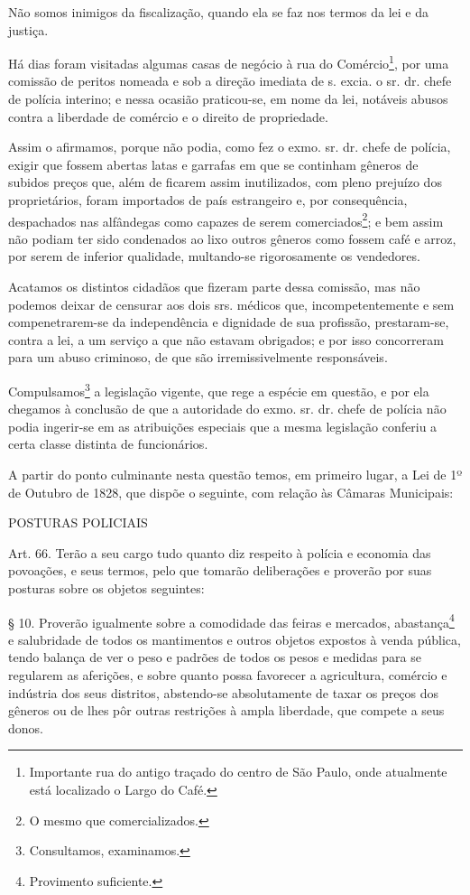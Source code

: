 \asterisc{}

Não somos inimigos da fiscalização, quando ela se faz nos termos da lei
e da justiça.

Há dias foram visitadas algumas casas de negócio à rua do
Comércio\footnote{Importante rua do antigo traçado do centro de São
  Paulo, onde atualmente está localizado o Largo do Café.}, por uma
comissão de peritos nomeada e sob a direção imediata de s. excia. o sr.
dr. chefe de polícia interino; e nessa ocasião praticou-se, em nome da
lei, notáveis abusos contra a liberdade de comércio e o direito de
propriedade.

Assim o afirmamos, porque não podia, como fez o exmo. sr. dr. chefe de
polícia, exigir que fossem abertas latas e garrafas em que se continham
gêneros de subidos preços que, além de ficarem assim inutilizados, com
pleno prejuízo dos proprietários, foram importados de país estrangeiro
e, por consequência, despachados nas alfândegas como capazes de serem
comerciados\footnote{O mesmo que comercializados.}; e bem assim não
podiam ter sido condenados ao lixo outros gêneros como fossem café e
arroz, por serem de inferior qualidade, multando-se rigorosamente os
vendedores.

Acatamos os distintos cidadãos que fizeram parte dessa comissão, mas não
podemos deixar de censurar aos dois srs. médicos que, incompetentemente
e sem compenetrarem-se da independência e dignidade de sua profissão,
prestaram-se, contra a lei, a um serviço a que não estavam obrigados; e
por isso concorreram para um abuso criminoso, de que são
irremissivelmente responsáveis.

Compulsamos\footnote{Consultamos, examinamos.} a legislação vigente,
que rege a espécie em questão, e por ela chegamos à conclusão de que a
autoridade do exmo. sr. dr. chefe de polícia não podia ingerir-se em as
atribuições especiais que a mesma legislação conferiu a certa classe
distinta de funcionários.

A partir do ponto culminante nesta questão temos, em primeiro lugar, a
Lei de 1º de Outubro de 1828, que dispõe o seguinte, com relação às
Câmaras Municipais:

POSTURAS POLICIAIS

Art. 66. Terão a seu cargo tudo quanto diz respeito à polícia e economia
das povoações, e seus termos, pelo que tomarão deliberações e proverão
por suas posturas sobre os objetos seguintes:

\noindent\dotfill

§ 10. Proverão igualmente sobre a comodidade das feiras e mercados,
abastança\footnote{Provimento suficiente.} e salubridade de todos os
mantimentos e outros objetos expostos à venda pública, tendo balança de
ver o peso e padrões de todos os pesos e medidas para se regularem as
aferições, e sobre quanto possa favorecer a agricultura, comércio e
indústria dos seus distritos, abstendo-se absolutamente de taxar os
preços dos gêneros ou de lhes pôr outras restrições à ampla liberdade,
que compete a seus donos.

